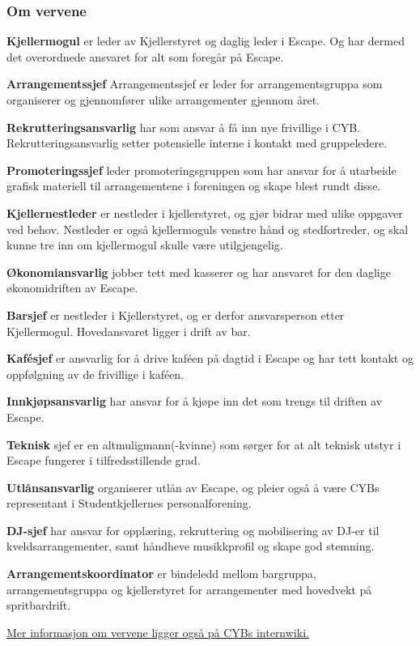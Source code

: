 \documentclass[12pt, norsk, a4paper]{proc}
\begin{document}
\hypertarget{om-vervene}{%
\subsubsection*{Om vervene}\label{om-vervene}}

\textbf{Kjellermogul} er leder av Kjellerstyret og daglig leder i
Escape. Og har dermed det overordnede ansvaret for alt som foregår på
Escape.

\textbf{Arrangementssjef} Arrangementssjef er leder for arrangementsgruppa som organiserer og gjennomfører ulike arrangementer gjennom året. 

\textbf{Rekrutteringsansvarlig} har som ansvar å få inn nye frivillige i
CYB. Rekrutteringsansvarlig setter potensielle interne i kontakt med
gruppeledere.

\textbf{Promoteringssjef} leder promoteringsgruppen som har ansvar for å
utarbeide grafisk materiell til arrangementene i foreningen og skape
blest rundt disse.

\textbf{Kjellernestleder} er nestleder i kjellerstyret, og gjør bidrar
med ulike oppgaver ved behov. Nestleder er også kjellermoguls venstre
hånd og stedfortreder, og skal kunne tre inn om kjellermogul skulle være
utilgjengelig.

\textbf{Økonomiansvarlig} jobber tett med kasserer og har ansvaret for
den daglige økonomidriften av Escape.

\textbf{Barsjef} er nestleder i Kjellerstyret, og er derfor
ansvarsperson etter Kjellermogul. Hovedansvaret ligger i drift av bar.

\textbf{Kafésjef} er ansvarlig for å drive kaféen på dagtid i Escape og
har tett kontakt og oppfølgning av de frivillige i kaféen.

\textbf{Innkjøpsansvarlig} har ansvar for å kjøpe inn det som trengs til
driften av Escape.

\textbf{Teknisk} sjef er en altmuligmann(-kvinne) som sørger for at alt
teknisk utstyr i Escape fungerer i tilfredsstillende grad.

\textbf{Utlånsansvarlig} organiserer utlån av Escape, og pleier også å
være CYBs representant i Studentkjellernes personalforening.

\textbf{DJ-sjef} har ansvar for opplæring, rekruttering og mobilisering
av DJ-er til kveldsarrangementer, samt håndheve musikkprofil og skape
god stemning.

\textbf{Arrangementskoordinator} er bindeledd mellom bargruppa,
arrangementsgruppa og kjellerstyret for arrangementer med hovedvekt på
spritbardrift.

\href{https://wiki.cyb.no/display/AKTIV/Vervoversikt}{Mer informasjon om vervene ligger også på CYBs internwiki.}
\end{document}
